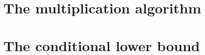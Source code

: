 \documentclass[11pt]{article}
\begin{document}
\maketitle

\begin{abstract}
A single deterministic multitape Turing machine multiplies two $n$-bit
integers exactly in $n(1+\log n)^{1/2+o(1)}$ time and visits $O(n)$
tape cells. Under the variable-count Weak Exponential Time Hypothesis
for 3-SAT, every deterministic multitape multiplier requires $\Omega(n\sqrt{\log n})$
steps in the worst case at each sufficiently large length. Under this
hypothesis the optimal logarithmic exponent is therefore $1/2$.
Exact integer division and integer square root have the same upper
and conditional lower bounds.
\end{abstract}


\medskip
{\small\tableofcontents}
\clearpage

\part{The multiplication algorithm}\label{part:algorithm}






\part{The conditional lower bound}\label{part:lower}





\end{document}
